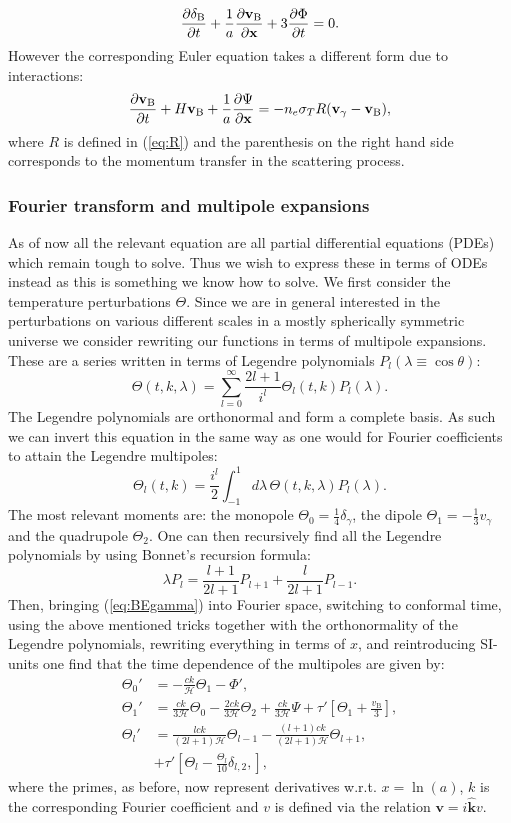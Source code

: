 \documentclass[%
reprint,
 amsmath,amssymb,
 aps,
]{revtex4-2}
\newcommand{\Hp}{\mathcal{H}}
\begin{document}
\begin{equation}
	\pdv{\delta_\text{B}}{t}+\frac{1}{a}\pdv{\textbf{v}_\text{B}}{\textbf{x}}+3\pdv{\Phi}{t}=0.
	\label{eq:contB}
\end{equation}
However the corresponding Euler equation takes a different form due to interactions:
\begin{equation}
	\pdv{\textbf{v}_\text{B}}{t}+H\textbf{v}_\text{B}+\frac{1}{a}\pdv{\Psi}{\textbf{x}}=-n_e\sigma_T R(\textbf{v}_\gamma-\textbf{v}_\text{B}),
\end{equation}
where $R$ is defined in (\ref{eq:R}) and the parenthesis on the right hand side corresponds to the momentum transfer in the scattering process.
\subsubsection{Fourier transform and multipole expansions}
As of now all the relevant equation are all partial differential equations (PDEs) which remain tough to solve. Thus we wish to express these in terms of ODEs instead as this is something we know how to solve. We first consider the temperature perturbations $\Theta$. Since we are in general interested in the perturbations on various different scales in a mostly spherically symmetric universe we consider rewriting our functions in terms of multipole expansions. These are a series written in terms of Legendre polynomials $P_l(\lambda\equiv\cos\theta)$:
\[\Theta(t,k,\lambda)=\sum_{l=0}^\infty\frac{2l+1}{i^l}\Theta_l(t,k)P_l(\lambda).\]
The Legendre polynomials are orthonormal and form a complete basis. As such we can invert this equation in the same way as one would for Fourier coefficients to attain the Legendre multipoles:
\[\Theta_l(t,k)=\frac{i^l}{2}\int_{-1}^1d\lambda\, \Theta(t,k,\lambda)P_l(\lambda).\]
The most relevant moments are: the monopole $\Theta_0=\frac14\delta_\gamma$, the dipole $\Theta_1=-\frac13v_\gamma$ and the quadrupole $\Theta_2$. One can then recursively find all the Legendre polynomials by using Bonnet's recursion formula:
\[\lambda P_l=\frac{l+1}{2l+1}P_{l+1}+\frac{l}{2l+1}P_{l-1}.\]
Then, bringing (\ref{eq:BEgamma}) into Fourier space, switching to conformal time, using the above mentioned tricks together with the orthonormality of the Legendre polynomials, rewriting everything in terms of $x$, and reintroducing SI-units one find that the time dependence of the multipoles are given by:
\begin{align*}
	\Theta_0'&=-\frac{ck}{\Hp}\Theta_1-\Phi',\\
	\Theta_1'&=\frac{ck}{3\Hp}\Theta_0-\frac{2ck}{3\Hp}\Theta_2+\frac{ck}{3\Hp}\Psi+\tau'\left[\Theta_1+\frac{v_\text{B}}{3}\right],\\
	\Theta_l'&=\frac{lck}{(2l+1)\Hp}\Theta_{l-1}-\frac{(l+1)ck}{(2l+1)\Hp}\Theta_{l+1},\\
	&+\tau'\left[\Theta_l-\frac{\Theta_l}{10}\delta_{l,2},\right],
\end{align*}
where the primes, as before, now represent derivatives w.r.t. $x=\ln(a)$, $k$ is the corresponding Fourier coefficient and $v$ is defined via the relation $\textbf{v}=i\hat{\textbf{k}}v$.
\end{document}
